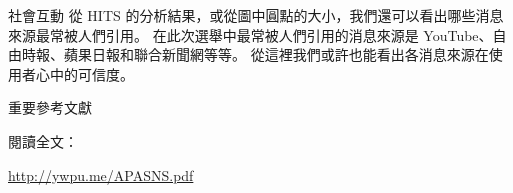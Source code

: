 \documentclass{beamer}
\begin{document}
\begin{CJK}{UTF8}{bkai}
\begin{frame}{社會互動}
\justifying
\qquad 從 HITS 的分析結果，或從圖中圓點的大小，我們還可以看出哪些消息來源最常被人們引用。%
在此次選舉中最常被人們引用的消息來源是 YouTube、自由時報、蘋果日報和聯合新聞網等等。%
從這裡我們或許也能看出各消息來源在使用者心中的可信度。%
\end{frame}

\begin{frame}{重要參考文獻}
\nocite{*}


\end{frame}

\begin{frame}
\centering
{\LARGE 閱讀全文：\par\url{http://ywpu.me/APASNS.pdf}\par}
\end{frame}

\end{CJK}
\end{document}
